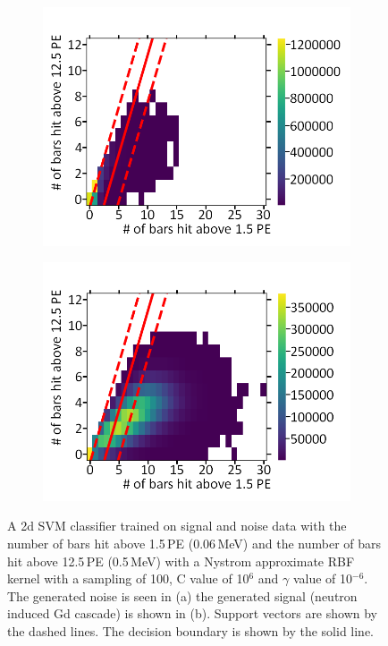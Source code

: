 \begin{figure}[!h]
\centering
\begin{subfigure}{.5\textwidth}
  \centering
  \includegraphics[width=\linewidth]{Chapter4/Figs/Raster/noiseNeutronSVM_C1e6_g1e-6MedText.png}
  \captionsetup{width=.9\linewidth}
  \caption{}
  \label{subFig:noiseNeutronSVM_C1e6_g1e-6}
\end{subfigure}%
\begin{subfigure}{.5\textwidth}
  \centering
  \includegraphics[width=\linewidth]{Chapter4/Figs/Raster/signalNeutronSVM_C1e6_g1e-6MedText.png}
  \captionsetup{width=.9\linewidth}
  \caption{}
  \label{subFig:signalNeutronSVM_C1e6_g1e-6}
\end{subfigure}
\caption{A 2d SVM classifier trained on signal and noise data with the number of bars hit above 1.5\,PE (0.06\,MeV) and the number of bars hit above 12.5\,PE (0.5\,MeV) with a Nystrom approximate RBF kernel with a sampling of 100, C value of 10$^6$ and $\gamma$ value of 10$^{-6}$. The generated noise is seen in (a) the generated signal (neutron induced Gd cascade) is shown in (b). Support vectors are shown by the dashed lines. The decision boundary is shown by the solid line.}
\label{fig:signalAndNoiseNeutronSVM_C1e6_g1e-6}
\end{figure}

